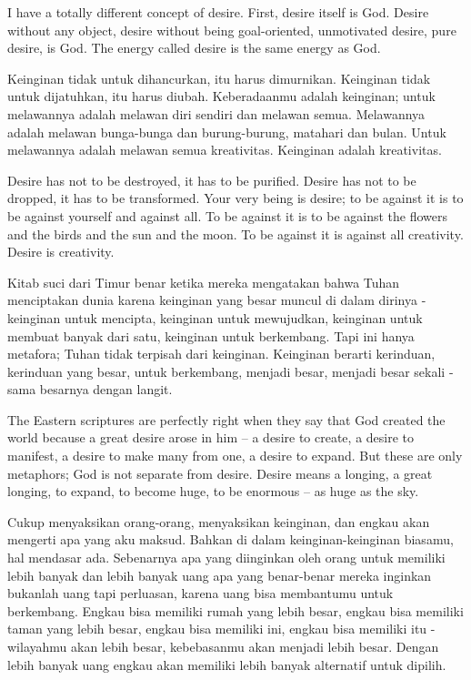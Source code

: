 \english
I have a totally different concept of desire. First, desire itself is God. Desire without any object, desire without being goal-oriented, unmotivated desire, pure desire, is God. The energy called desire is the same energy as God.

\bahasa
Keinginan tidak untuk dihancurkan, itu harus dimurnikan. Keinginan tidak untuk dijatuhkan, itu harus diubah. Keberadaanmu adalah keinginan; untuk melawannya adalah melawan diri sendiri dan melawan semua. Melawannya adalah melawan bunga-bunga dan burung-burung, matahari dan bulan. Untuk melawannya adalah melawan semua kreativitas. Keinginan adalah kreativitas.

\english
Desire has not to be destroyed, it has to be purified. Desire has not to be dropped, it has to be transformed. Your very being is desire; to be against it is to be against yourself and against all. To be against it is to be against the flowers and the birds and the sun and the moon. To be against it is against all creativity. Desire is creativity.

\bahasa
Kitab suci dari Timur benar ketika mereka mengatakan bahwa Tuhan menciptakan dunia karena keinginan yang besar muncul di dalam dirinya - keinginan untuk mencipta, keinginan untuk mewujudkan, keinginan untuk membuat banyak dari satu, keinginan untuk berkembang. Tapi ini hanya metafora; Tuhan tidak terpisah dari keinginan. Keinginan berarti kerinduan, kerinduan yang besar, untuk berkembang, menjadi besar, menjadi besar sekali - sama besarnya dengan langit.

\english
The Eastern scriptures are perfectly right when they say that God created the world because a great desire arose in him -- a desire to create, a desire to manifest, a desire to make many from one, a desire to expand. But these are only metaphors; God is not separate from desire. Desire means a longing, a great longing, to expand, to become huge, to be enormous -- as huge as the sky.

\bahasa
Cukup menyaksikan orang-orang, menyaksikan keinginan, dan engkau akan mengerti apa yang aku maksud. Bahkan di dalam keinginan-keinginan biasamu, hal mendasar ada. Sebenarnya apa yang diinginkan oleh orang untuk memiliki lebih banyak dan lebih banyak uang apa yang benar-benar mereka inginkan bukanlah uang tapi perluasan, karena uang bisa membantumu untuk berkembang. Engkau bisa memiliki rumah yang lebih besar, engkau bisa memiliki taman yang lebih besar, engkau bisa memiliki ini, engkau bisa memiliki itu - wilayahmu akan lebih besar, kebebasanmu akan menjadi lebih besar. Dengan lebih banyak uang engkau akan memiliki lebih banyak alternatif untuk dipilih.

